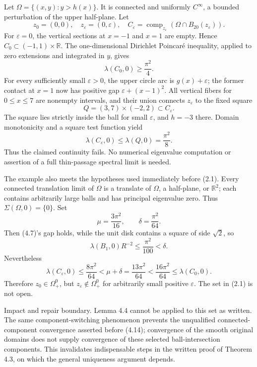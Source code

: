 \documentclass[10pt]{article}
\begin{document}
Let \(\Omega=\{(x,y):y>h(x)\}\). It is connected and uniformly \(C^\infty\), a bounded perturbation of the upper half-plane. Let \[z_0=(0,0),\quad z_\varepsilon=(0,\varepsilon),\quad
 C_\varepsilon=\operatorname{comp}_{z_\varepsilon}
                  (\Omega\cap B_{20}(z_\varepsilon)).\] For \(\varepsilon=0\), the vertical sections at \(x=-1\) and \(x=1\) are empty. Hence \(C_0\subset(-1,1)\times\mathbb R\). The one-dimensional Dirichlet Poincaré inequality, applied to zero extensions and integrated in \(y\), gives \[\lambda(C_0,0)\ge\frac{\pi^2}{4}.                            \tag{2.3}\] For every sufficiently small \(\varepsilon>0\), the upper circle arc is \(g(x)+\varepsilon\); the former contact at \(x=1\) now has positive gap \(\varepsilon+(x-1)^2\). All vertical fibers for \(0\le x\le7\) are nonempty intervals, and their union connects \(z_\varepsilon\) to the fixed square \[Q=(3,7)\times(-2,2)\subset C_\varepsilon.\] The square lies strictly inside the ball for small \(\varepsilon\), and \(h=-3\) there. Domain monotonicity and a square test function yield \[\lambda(C_\varepsilon,0)\le\lambda(Q,0)
 =\frac{\pi^2}{8}.                                          \tag{2.4}\] Thus the claimed continuity fails. No numerical eigenvalue computation or assertion of a full thin-passage spectral limit is needed.\par
The example also meets the hypotheses used immediately before (2.1). Every connected translation limit of \(\Omega\) is a translate of \(\Omega\), a half-plane, or \(\mathbb R^2\); each contains arbitrarily large balls and has principal eigenvalue zero. Thus \(\Sigma(\Omega,0)=\{0\}\). Set \[\mu=\frac{3\pi^2}{16},\qquad \delta=\frac{\pi^2}{64}.\] Then (4.7)’s gap holds, while the unit disk contains a square of side \(\sqrt2\), so \[\lambda(B_1,0)R^{-2}\le\frac{\pi^2}{100}<\delta .\] Nevertheless \[\lambda(C_\varepsilon,0)\le\frac{8\pi^2}{64}
 <\mu+\delta=\frac{13\pi^2}{64}
 <\frac{16\pi^2}{64}\le\lambda(C_0,0).\] Therefore \(z_0\in\Omega_+^0\), but \(z_\varepsilon\notin\Omega_+^0\) for arbitrarily small positive \(\varepsilon\). The set in (2.1) is not open.\par
Impact and repair boundary. Lemma 4.4 cannot be applied to this set as written. The same component-switching phenomenon prevents the unqualified connected-component convergence asserted before (4.14); convergence of the smooth original domains does not supply convergence of these selected ball-intersection components. This invalidates indispensable steps in the written proof of Theorem 4.3, on which the general uniqueness argument depends.\par
\end{document}
